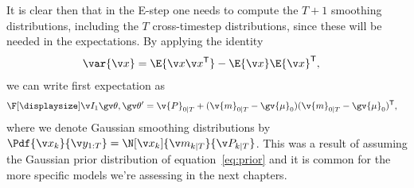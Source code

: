 %
%
It is clear then that in the E-step one needs to compute the $T+1$ smoothing
distributions, including the $T$ cross-timestep distributions, since these
will be needed in the expectations.
By applying the identity
\begin{align}
	\var{\x}&=\E{\x\x^\tr}-\E{\x}\E{\x}^\tr,
\end{align} 
we can write first expectation as
\begin{align}
	\II{1}&= \v{P}_{0|T}+(\v{m}_{0|T}-\gv{\mu}_0)(\v{m}_{0|T}-\gv{\mu}_0)^\tr,
	\label{eq:I1}
\end{align}
where we denote Gaussian smoothing distributions by $\Pdf{\xk}{\Y}=\N[\xk]{\m_{k|T}}{\P_{k|T}}$.
This was a result of assuming the Gaussian prior distribution of equation~\eqref{eq:prior} and
it is common for the more specific models we're assessing in the next chapters.

